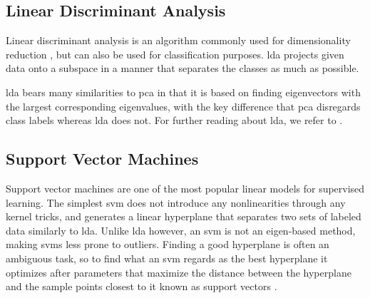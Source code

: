 


\subsection{Linear Discriminant Analysis}

Linear discriminant analysis is an algorithm commonly used for dimensionality reduction \citep{raschka_2014}, but can also be used for classification purposes. \gls{lda} projects given data onto a subspace in a manner that separates the classes as much as possible. 

\gls{lda} bears many similarities to \gls{pca} in that it is based on finding eigenvectors with the largest corresponding eigenvalues, with the key difference that \gls{pca} disregards class labels whereas \gls{lda} does not. For further reading about \gls{lda}, we refer to \citep{raschka_2014}.



\subsection{Support Vector Machines}

Support vector machines are one of the most popular linear models for supervised learning. The simplest \gls{svm} does not introduce any nonlinearities through any kernel tricks, and generates a linear hyperplane that separates two sets of labeled data similarly to \gls{lda}. Unlike \gls{lda} however, an \gls{svm} is not an eigen-based method, making \gls{svm}s less prone to outliers. Finding a good hyperplane is often an ambiguous task, so to find what an \gls{svm} regards as the best hyperplane it optimizes after parameters that maximize the distance between the hyperplane and the sample points closest to it known as support vectors \citep{boswell_2002}. 


